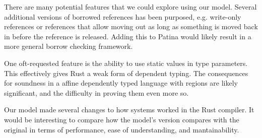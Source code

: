 There are many potential features that we could explore using our model.
Several additional versions of borrowed references has been purposed,
e.g. write-only references or references that allow moving out as long as something
is moved back in before the reference is released. Adding this to Patina would likely
result in a more general borrow checking framework.

One oft-requested feature is the ability to use static values in type parameters.
This effectively gives Rust a weak form of dependent typing.
The consequences for soundness in a affine dependently typed language with regions
are likely significant, and the difficulty in proving them even more so.

Our model made several changes to how systems worked in the Rust compiler.
It would be interesting to compare how the model's version compares with the original
in terms of performance, ease of understanding, and mantainability.
